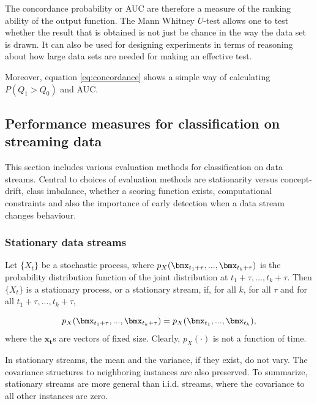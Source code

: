 The concordance probability or AUC are therefore a measure of the ranking ability of the output function.  The Mann Whitney $U$-test allows one to test whether the result that is obtained is not just be chance in the way the data set is drawn.  It can also be used for designing experiments in terms of reasoning about how large data sets are needed for making an effective test.

Moreover, equation \eqref{eq:concordance} shows a simple way of calculating $P(Q_1 > Q_0)$ and AUC.


\subsection{Performance measures for classification on streaming data}
\label{sec:stream}

This section includes various evaluation methods for classification on data streams.  Central to choices of evaluation methods are stationarity versus concept-drift, class imbalance, whether a scoring function exists, computational constraints and also the importance of early detection when a data stream changes behaviour.

\subsubsection{Stationary data streams}
\label{sec:stationary}

Let $\{X_{t}\}$ be a stochastic process, where $p_X(\bmx_{t_1 + \tau},...,\bmx_{t_k + \tau} )$ is the probability distribution function of the joint distribution at $t_1 + \tau,...,t_k + \tau$.  Then $\{X_t\}$ is a stationary process, or a stationary stream, if, for all $k$, for all $\tau$ and for all $t_1 + \tau,...,t_k + \tau$, 

\begin{equation}
\label{eq:stationarity}
p_X(\bmx_{t_1 + \tau},...,\bmx_{t_k + \tau} ) = p_X(\bmx_{t_1},...,\bmx_{t_k} ),
\end{equation}
where the $\bm{x_t}$s are vectors of fixed size.  Clearly, $p_X(\cdot)$ is not a function of time.  

In stationary streams, the mean and the variance, if they exist, do not vary.  The covariance structures to neighboring instances are also preserved.  To summarize, stationary streams are more general than i.i.d. streams, where the covariance to all other instances are zero.  

